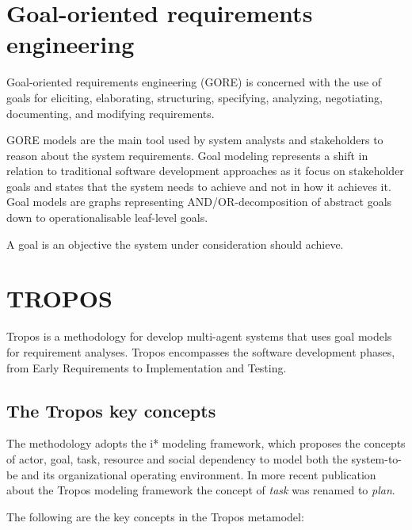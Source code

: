 \section{Goal-oriented requirements engineering}

Goal-oriented requirements engineering (GORE) is concerned with the use of goals for eliciting, elaborating, structuring, specifying, analyzing, negotiating, documenting, and modifying requirements\cite{van_lamsweerde_goal-oriented_2001}.

GORE models are the main tool used by system analysts and stakeholders to reason about the system requirements. Goal modeling represents a shift in relation to traditional software development approaches as it focus on stakeholder goals and states that the system needs to achieve and not in how it achieves it\cite{ali_goal-based_2010}. Goal models are graphs representing AND/OR-decomposition of abstract goals down to operationalisable leaf-level goals. \cite{morandini_operational_2009}

A goal is an objective the system under consideration should achieve. \cite{van_lamsweerde_goal-oriented_2001}

\section{TROPOS}
Tropos\cite{bresciani_tropos:_2004} is a methodology for develop multi-agent systems that uses goal models for requirement analyses. Tropos encompasses the software development phases, from Early Requirements to Implementation and Testing.

\subsection{The Tropos key concepts}

The methodology adopts the i* \cite{yu_modelling_1996} modeling framework, which proposes the concepts of actor, goal, task, resource and social dependency to model both the system-to-be and its organizational operating environment\cite{bresciani_tropos:_2004}. In more recent publication \cite{morandini_tropos_2014} about the Tropos modeling framework the concept of \textit{task} was renamed to \textit{plan}.

The following are the key concepts in the Tropos metamodel\cite{bresciani_tropos:_2004}\cite{morandini_tropos_2014}:

